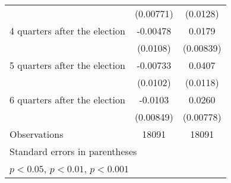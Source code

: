 \begin{table}[htbp]
\begin{tabular}{l*{2}{c}}
                    &   (0.00771)         &    (0.0128)         \\
[1em]
 4 quarters after the election&    -0.00478         &      0.0179\sym{*}  \\
                    &    (0.0108)         &   (0.00839)         \\
[1em]
 5 quarters after the election&    -0.00733         &      0.0407\sym{***}\\
                    &    (0.0102)         &    (0.0118)         \\
[1em]
 6 quarters after the election&     -0.0103         &      0.0260\sym{***}\\
                    &   (0.00849)         &   (0.00778)         \\
\hline
Observations        &       18091         &       18091         \\
\hline\hline
\multicolumn{3}{l}{\footnotesize Standard errors in parentheses}\\
\multicolumn{3}{l}{\footnotesize \sym{*} \(p<0.05\), \sym{**} \(p<0.01\), \sym{***} \(p<0.001\)}\\
\end{tabular}
\end{table}
